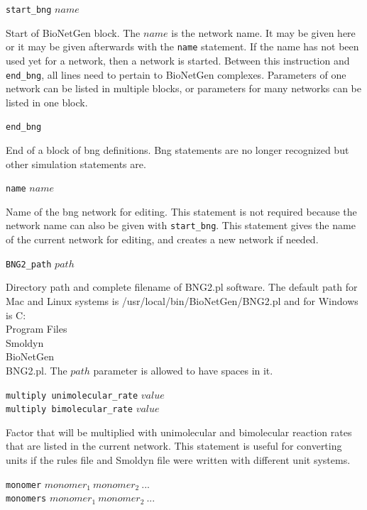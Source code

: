 \documentclass {book}
\newcommand {\ttt} {\texttt}
\begin{document}
\begin{description}

\item{\ttt{start\_bng} $name$}

Start of BioNetGen block. The $name$ is the network name. It may be given here or it may be given afterwards with the \ttt{name} statement. If the name has not been used yet for a network, then a network is started. Between this instruction and \ttt{end\_bng}, all lines need to pertain to BioNetGen complexes. Parameters of one network can be listed in multiple blocks, or parameters for many networks can be listed in one block.

\item{\ttt{end\_bng}}

End of a block of bng definitions. Bng statements are no longer recognized but other simulation statements are.

\item{\ttt{name} $name$}

Name of the bng network for editing. This statement is not required because the network name can also be given with \ttt{start\_bng}. This statement gives the name of the current network for editing, and creates a new network if needed.

\item{\ttt{BNG2\_path} $path$}

Directory path and complete filename of BNG2.pl software. The default path for Mac and Linux systems is /usr/local/bin/BioNetGen/BNG2.pl and for Windows is C:\\Program Files\\Smoldyn\\BioNetGen\\BNG2.pl. The $path$ parameter is allowed to have spaces in it.

\item{\ttt{multiply unimolecular\_rate} $value$\\
\ttt{multiply bimolecular\_rate} $value$}

Factor that will be multiplied with unimolecular and bimolecular reaction rates that are listed in the current network. This statement is useful for converting units if the rules file and Smoldyn file were written with different unit systems.

\item{\ttt{monomer} $monomer_1\ monomer_2\ ...$\\
\ttt{monomers} $monomer_1\ monomer_2\ ...$}


\end{description}
\end{document}
